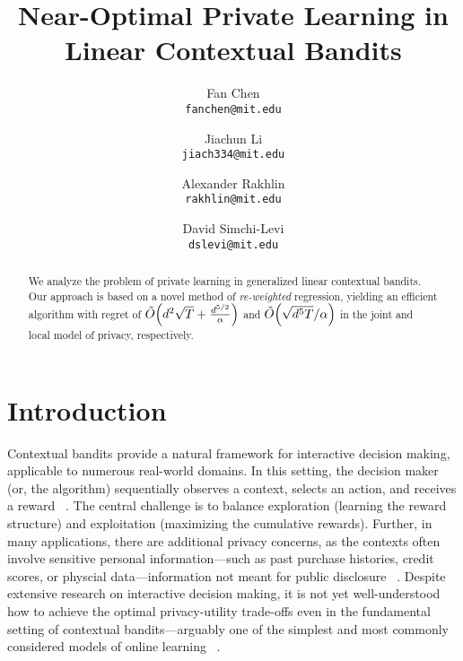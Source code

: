\documentclass{article}
\title{Near-Optimal Private Learning in Linear Contextual Bandits}
\author{Fan Chen\\{\small \texttt{fanchen@mit.edu}} \and  Jiachun Li\\{\small \texttt{jiach334@mit.edu}} \and Alexander Rakhlin\\{\small \texttt{rakhlin@mit.edu}} \and David Simchi-Levi\\{\small \texttt{dslevi@mit.edu}} }
\begin{document}
\maketitle

\begin{abstract}
We analyze the problem of private learning in generalized linear contextual bandits. Our approach is based on a novel method of \emph{re-weighted} regression, yielding an efficient algorithm with regret of $\tilde{O}{\left( d^2\sqrt{T}+\frac{d^{5/2}}{\alpha} \right)}$ and $\tilde{O}{\left( \sqrt{d^5T}/\alpha \right)}$ in the joint and local model of privacy, respectively. 
\end{abstract}


\section{Introduction}\label{sec:intro}


Contextual bandits provide a natural framework for interactive decision making, applicable to numerous real-world domains. In this setting, the decision maker (or, the algorithm) sequentially observes a context, selects an action, and receives a reward ~\citep{abbasi2011improved, auer2002finite, simchi2020bypassing, foster2020beyond}. The central challenge is to balance exploration (learning the reward structure) and exploitation (maximizing the cumulative rewards). Further, in many applications, there are additional privacy concerns, as the contexts often involve sensitive personal information---such as past purchase histories, credit scores, or physcial data---information not meant for public disclosure ~\citep{dwork2014algorithmic, lei2024privacy, chen2022privacy}. Despite extensive research on interactive decision making, it is not yet well-understood how to achieve the optimal privacy-utility trade-offs even in the fundamental setting of contextual bandits---arguably one of the simplest and most commonly considered models of online learning ~\citep{shariff2018differentially, azize2024open}.
\end{document}

